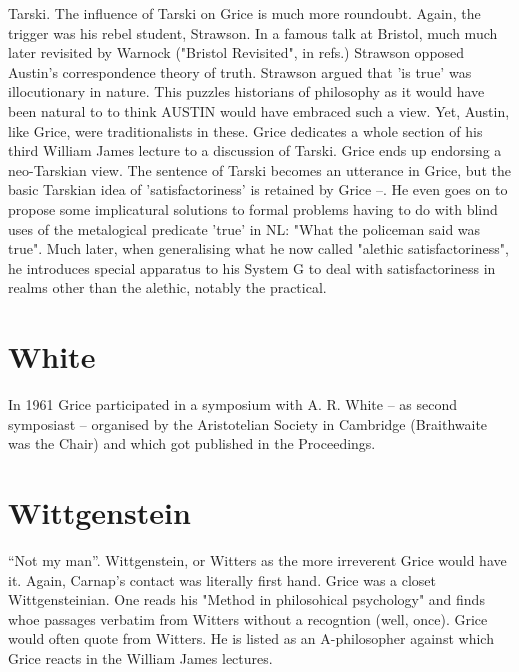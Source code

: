 \documentclass[10pt,titlepage]{book}
\begin{document}
Tarski. The influence of Tarski on Grice is much more roundoubt. Again, the 
 trigger was his rebel student, Strawson. In a famous talk at Bristol,  
much much later revisited by Warnock ("Bristol Revisited", in refs.) Strawson  
opposed Austin's correspondence theory of truth. Strawson argued that 'is  
true' was illocutionary in nature. This puzzles historians of philosophy as 
it  would have been natural to to think AUSTIN would have embraced such a 
view.  Yet, Austin, like Grice, were traditionalists in these. Grice dedicates 
a  whole section of his third William James lecture to a discussion of 
Tarski.  Grice ends up endorsing a neo-Tarskian view. The sentence of Tarski 
becomes an  utterance in Grice, but the basic Tarskian idea of 
'satisfactoriness' is  retained by Grice --. He even goes on to propose some implicatural 
solutions to  formal problems having to do with blind uses of the metalogical 
predicate  'true' in NL: "What the policeman said was true". Much later, when 
 generalising what he now called "alethic satisfactoriness", he introduces  
special apparatus to his System G to deal with satisfactoriness in realms 
other  than the alethic, notably the practical. 

\section{White}

In 1961 Grice participated in a symposium with A. R. White -- as second  
symposiast -- organised by the Aristotelian Society in Cambridge (Braithwaite  
was the Chair) and which got published in the Proceedings.

\section{Wittgenstein}
 
“Not my man”. Wittgenstein, or Witters as the more irreverent Grice would have it.
Again, Carnap's contact was literally first hand.
Grice  was a closet Wittgensteinian.
One reads his "Method in philosohical psychology" and finds whoe passages verbatim from Witters without a 
recogntion (well, once).
Grice would often quote from Witters.
He is listed as an  A-philosopher against which Grice reacts in the William James lectures.
\end{document}

